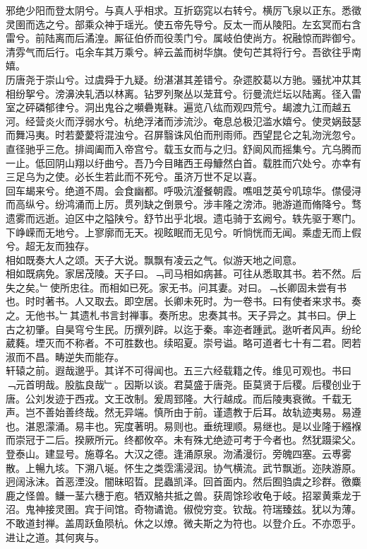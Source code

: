 \documentclass{zhvt-classic}
\begin{document}
\hspace*{2em}邪绝少阳而登太阴兮。与真人乎相求。互折窈窕以右转兮。横厉飞泉以正东。悉徵灵圉而选之兮。部乘众神于瑶光。使五帝先导兮。反太一而从陵阳。左玄冥而右含雷兮。前陆离而后潏湟。厮征伯侨而役羡门兮。属岐伯使尚方。祝融惊而跸御兮。清雰气而后行。屯余车其万乘兮。綷云盖而树华旗。使句芒其将行兮。吾欲往乎南嬉。\\
\hspace*{2em}历唐尧于崇山兮。过虞舜于九疑。纷湛湛其差错兮。杂遝胶葛以方驰。骚扰冲苁其相纷挐兮。滂濞泱轧洒以林离。钻罗列聚丛以茏茸兮。衍曼流烂坛以陆离。径入雷室之砰磷郁律兮。洞出鬼谷之嚬礨嵬靺。遍览八纮而观四荒兮。朅渡九江而越五河。经营炎火而浮弱水兮。杭绝浮渚而涉流沙。奄息总极氾滥水嬉兮。使灵娲鼓瑟而舞冯夷。时若薆薆将混浊兮。召屏翳诛风伯而刑雨师。西望昆仑之轧沕洸忽兮。直径驰乎三危。排阊阖而入帝宫兮。载玉女而与之归。舒阆风而摇集兮。亢乌腾而一止。低回阴山翔以纡曲兮。吾乃今目睹西王母鱇然白首。载胜而穴处兮。亦幸有三足乌为之使。必长生若此而不死兮。虽济万世不足以喜。\\
\hspace*{2em}回车朅来兮。绝道不周。会食幽都。呼吸沆瀣餐朝霞。噍咀芝英兮叽琼华。僸侵浔而高纵兮。纷鸿涌而上厉。贯列缺之倒景兮。涉丰隆之滂沛。驰游道而脩降兮。骛遗雾而远逝。迫区中之隘陕兮。舒节出乎北垠。遗屯骑于玄阙兮。轶先驱于寒门。下峥嵘而无地兮。上寥廓而无天。视眩眠而无见兮。听惝恍而无闻。乘虚无而上假兮。超无友而独存。\\
\hspace*{2em}相如既奏大人之颂。天子大说。飘飘有凌云之气。似游天地之间意。\\
\hspace*{2em}相如既病免。家居茂陵。天子曰。﹁司马相如病甚。可往从悉取其书。若不然。后失之矣。﹂使所忠往。而相如已死。家无书。问其妻。对曰。﹁长卿固未尝有书也。时时著书。人又取去。即空居。长卿未死时。为一卷书。曰有使者来求书。奏之。无他书。﹂其遗札书言封禅事。奏所忠。忠奏其书。天子异之。其书曰。伊上古之初肇。自昊穹兮生民。历撰列辟。以迄于秦。率迩者踵武。逖听者风声。纷纶葳蕤。堙灭而不称者。不可胜数也。续昭夏。崇号谥。略可道者七十有二君。罔若淑而不昌。畴逆失而能存。\\
\hspace*{2em}轩辕之前。遐哉邈乎。其详不可得闻也。五三六经载籍之传。维见可观也。书曰﹁元首明哉。股肱良哉﹂。因斯以谈。君莫盛于唐尧。臣莫贤于后稷。后稷创业于唐。公刘发迹于西戎。文王改制。爰周郅隆。大行越成。而后陵夷衰微。千载无声。岂不善始善终哉。然无异端。慎所由于前。谨遗教于后耳。故轨迹夷易。易遵也。湛恩濛涌。易丰也。宪度著明。易则也。垂统理顺。易继也。是以业隆于繦褓而崇冠于二后。揆厥所元。终都攸卒。未有殊尤绝迹可考于今者也。然犹蹑梁父。登泰山。建显号。施尊名。大汉之德。逢涌原泉。沕潏漫衍。旁魄四塞。云尃雾散。上暢九垓。下溯八埏。怀生之类霑濡浸润。协气横流。武节飘逝。迩陕游原。迥阔泳沫。首恶湮没。闇昧昭晢。昆蟲凯泽。回首面内。然后囿驺虞之珍群。徼麋鹿之怪兽。鳒一茎六穗于庖。牺双觡共抵之兽。获周馀珍收龟于岐。招翠黄乘龙于沼。鬼神接灵圉。宾于间馆。奇物谲诡。俶傥穷变。钦哉。符瑞臻兹。犹以为薄。不敢道封禅。盖周跃鱼陨杭。休之以燎。微夫斯之为符也。以登介丘。不亦恧乎。进让之道。其何爽与。\\
\end{document}
